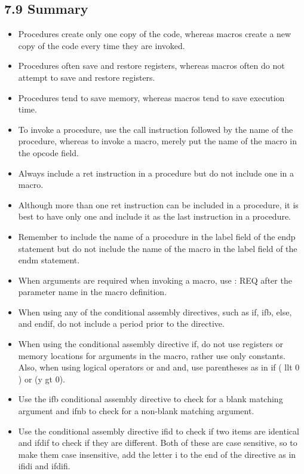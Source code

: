 \documentclass[10pt]{article}
\begin{document}
\subsection*{7.9 Summary}
\begin{itemize}
  \item Procedures create only one copy of the code, whereas macros create a new copy of the code every time they are invoked.
  \item Procedures often save and restore registers, whereas macros often do not attempt to save and restore registers.
  \item Procedures tend to save memory, whereas macros tend to save execution time.
  \item To invoke a procedure, use the call instruction followed by the name of the procedure, whereas to invoke a macro, merely put the name of the macro in the opcode field.
  \item Always include a ret instruction in a procedure but do not include one in a macro.
  \item Although more than one ret instruction can be included in a procedure, it is best to have only one and include it as the last instruction in a procedure.
  \item Remember to include the name of a procedure in the label field of the endp statement but do not include the name of the macro in the label field of the endm statement.
  \item When arguments are required when invoking a macro, use : REQ after the parameter name in the macro definition.
  \item When using any of the conditional assembly directives, such as if, ifb, else, and endif, do not include a period prior to the directive.
  \item When using the conditional assembly directive if, do not use registers or memory locations for arguments in the macro, rather use only constants. Also, when using logical operators or and and, use parentheses as in if ( llt 0 ) or (y gt 0).
  \item Use the ifb conditional assembly directive to check for a blank matching argument and ifnb to check for a non-blank matching argument.
  \item Use the conditional assembly directive ifid to check if two items are identical and ifdif to check if they are different. Both of these are case sensitive, so to make them case insensitive, add the letter i to the end of the directive as in ifidi and ifdifi.
\end{itemize}
\end{document}
